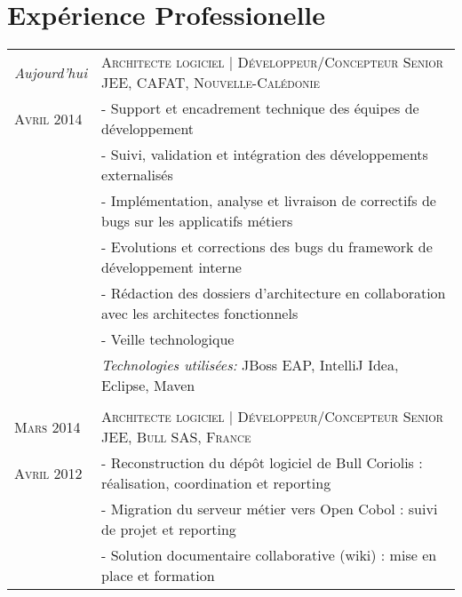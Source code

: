 \newcommand{\el}{\quad - \enspace}

\section{\texorpdfstring{\color{Blue}Expérience Professionelle}{Expérience Professionelle}}
\begin{longtable}{R{2.5cm}|p{14.8cm}}
  \emph{Aujourd'hui}      & \textsc{Architecte logiciel | Développeur/Concepteur Senior JEE, CAFAT, Nouvelle-Calédonie}   \\
  \textsc{Avril 2014}     & \el Support et encadrement technique des équipes de développement                             \\
                          & \el Suivi, validation et intégration des développements externalisés                          \\
                          & \el Implémentation, analyse et livraison de correctifs de bugs sur les applicatifs métiers    \\
                          & \el Evolutions et corrections des bugs du framework de développement interne                  \\
                          & \el Rédaction des dossiers d'architecture en collaboration avec les architectes fonctionnels  \\
                          & \el Veille technologique                                                                      \\
                          & \footnotesize{\emph{Technologies utilisées:} JBoss EAP, IntelliJ Idea, Eclipse, Maven }       \\
                                                                                                  \\
  \textsc{Mars 2014}      & \textsc{Architecte logiciel | Développeur/Concepteur Senior JEE, Bull SAS, France}            \\
  \textsc{Avril 2012}     & \el Reconstruction du dépôt logiciel de Bull Coriolis : réalisation, coordination et reporting\\
                          & \el Migration du serveur métier vers Open Cobol : suivi de projet et reporting                \\
                          & \el Solution documentaire collaborative (wiki) : mise en place et formation                   \\

\end{longtable}
